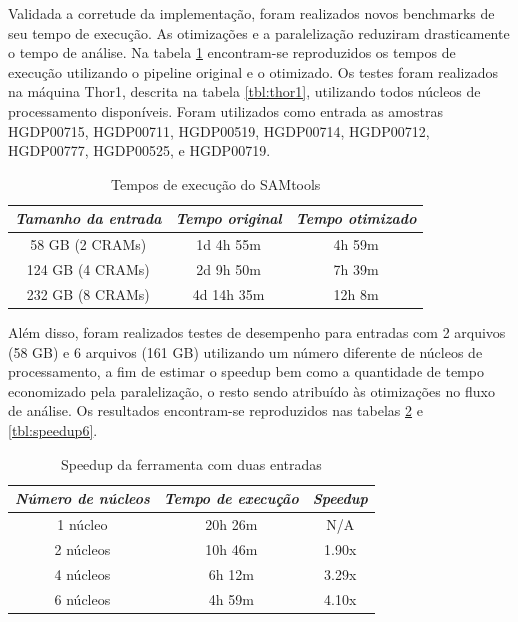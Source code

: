 \documentclass[cic,tc]{iiufrgs}
\begin{document}
Validada a corretude da implementação, foram realizados novos benchmarks de seu
tempo de execução. As otimizações e a paralelização reduziram drasticamente o
tempo de análise. Na tabela \ref{tbl:SAMtools} encontram-se reproduzidos os
tempos de execução utilizando o pipeline original e o otimizado. Os testes
foram realizados na máquina Thor1, descrita na tabela \ref{tbl:thor1},
utilizando todos núcleos de processamento disponíveis. Foram utilizados como
entrada as amostras HGDP00715, HGDP00711, HGDP00519, HGDP00714, HGDP00712,
HGDP00777, HGDP00525, e HGDP00719.

\begin{table}[h]
    \caption{Tempos de execução do SAMtools}
    \centering
        \begin{tabular}{c|c|c}
          \hline
          \textit{Tamanho da entrada}  &   \textit{Tempo original}  & \textit{Tempo otimizado} \\
          \hline
          \hline
          58 GB (2 CRAMs) & 1d 4h 55m & 4h 59m \\
          124 GB (4 CRAMs) & 2d 9h 50m & 7h 39m \\
          232 GB (8 CRAMs) & 4d 14h 35m & 12h 8m \\
          \hline
        \end{tabular}
    \label{tbl:SAMtools}
\end{table}

Além disso, foram realizados testes de desempenho para entradas com 2 arquivos
(58 GB) e 6 arquivos (161 GB) utilizando um número diferente de núcleos de
processamento, a fim de estimar o speedup bem como a quantidade de
tempo economizado pela paralelização, o resto sendo atribuído às otimizações no
fluxo de análise. Os resultados encontram-se reproduzidos nas tabelas
\ref{tbl:speedup2} e \ref{tbl:speedup6}.

\begin{table}[h]
    \caption{Speedup da ferramenta com duas entradas}
    \centering
        \begin{tabular}{c|c|c}
          \hline
          \textit{Número de núcleos}  &   \textit{Tempo de execução}  & \textit{Speedup} \\
          \hline
          \hline
          1 núcleo & 20h 26m & N/A \\
          2 núcleos & 10h 46m & 1.90x \\
          4 núcleos & 6h 12m & 3.29x \\
          6 núcleos & 4h 59m & 4.10x \\
          \hline
        \end{tabular}
    \label{tbl:speedup2}
\end{table}
\end{document}
